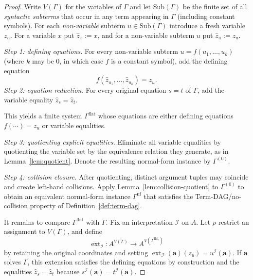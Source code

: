 \documentclass[11pt]{article}
\theoremstyle{plain}
\theoremstyle{definition}
\theoremstyle{definition}
\theoremstyle{remark}
\newcommand{\A}{A}
\begin{document}
\begin{proof}
Write $V(\Gamma)$ for the variables of $\Gamma$ and let $\mathrm{Sub}(\Gamma)$ be the finite set of all \emph{syntactic subterms}
that occur in any term appearing in $\Gamma$ (including constant symbols).
For each \emph{non-variable} subterm $u\in\mathrm{Sub}(\Gamma)$ introduce a fresh variable $z_u$.
For a variable $x$ put $\widehat z_x:=x$, and for a non-variable subterm $u$ put $\widehat z_u:=z_u$.

\smallskip
\noindent\emph{Step 1: defining equations.}
For every non-variable subterm $u=f(u_1,\dots,u_k)$ (where $k$ may be $0$, in which case $f$ is a constant symbol),
add the defining equation
\[
  f(\widehat z_{u_1},\dots,\widehat z_{u_k})=z_u.
\]
\noindent\emph{Step 2: equation reduction.}
For every original equation $s=t$ of $\Gamma$, add the variable equality $\widehat z_s=\widehat z_t$.

This yields a finite system $\Gamma^{\mathrm{flat}}$ whose equations are either defining equations
$f(\cdots)=z_u$ or variable equalities.

\smallskip
\noindent\emph{Step 3: quotienting explicit equalities.}
Eliminate all variable equalities by quotienting the variable set by the equivalence relation they generate, as in
Lemma~\ref{lem:quotient}.
Denote the resulting normal-form instance by $\Gamma^{(0)}$.

\smallskip
\noindent\emph{Step 4: collision closure.}
After quotienting, distinct argument tuples may coincide and create left-hand collisions.
Apply Lemma~\ref{lem:collision-quotient} to $\Gamma^{(0)}$ to obtain an equivalent normal-form instance
$\Gamma^{\mathrm{nf}}$ that satisfies the Term-DAG/no-collision property of Definition~\ref{def:term-dag}.

It remains to compare $\Gamma^{\mathrm{flat}}$ with $\Gamma$. Fix an interpretation $\mathcal I$ on $\A$.
Let $\rho$ restrict an assignment to $V(\Gamma)$, and define
\[
  \operatorname{ext}_{\mathcal I}:\A^{V(\Gamma)}\to \A^{V(\Gamma^{\mathrm{flat}})}
\]
by retaining the original coordinates and setting
$\operatorname{ext}_{\mathcal I}(\mathbf a)(z_u)=u^{\mathcal I}(\mathbf a)$.
If $\mathbf a$ solves $\Gamma$, this extension satisfies the defining equations by construction and the equalities
$\widehat z_s=\widehat z_t$ because $s^{\mathcal I}(\mathbf a)=t^{\mathcal I}(\mathbf a)$.


\end{proof}
\end{document}
